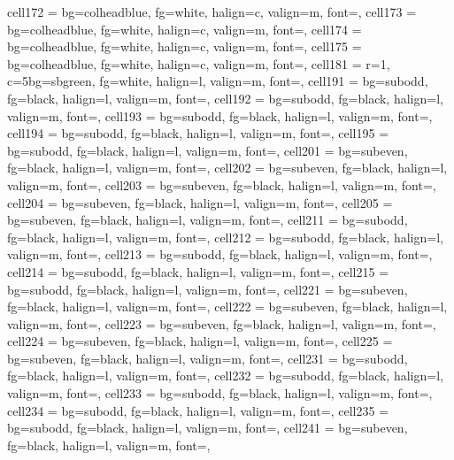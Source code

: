 \documentclass[a4paper,12pt]{article}
\begin{document}
\begin{longtblr}
{  cell{17}{2} = {bg=colheadblue, fg=white, halign=c, valign=m, font=\bfseries},
  cell{17}{3} = {bg=colheadblue, fg=white, halign=c, valign=m, font=\bfseries},
  cell{17}{4} = {bg=colheadblue, fg=white, halign=c, valign=m, font=\bfseries},
  cell{17}{5} = {bg=colheadblue, fg=white, halign=c, valign=m, font=\bfseries},
  cell{18}{1} = {r=1, c=5}{bg=sbgreen, fg=white, halign=l, valign=m, font=\small\bfseries},
  cell{19}{1} = {bg=subodd,  fg=black, halign=l, valign=m, font=\footnotesize},
  cell{19}{2} = {bg=subodd,  fg=black, halign=l, valign=m, font=\footnotesize},
  cell{19}{3} = {bg=subodd,  fg=black, halign=l, valign=m, font=\footnotesize},
  cell{19}{4} = {bg=subodd,  fg=black, halign=l, valign=m, font=\footnotesize},
  cell{19}{5} = {bg=subodd,  fg=black, halign=l, valign=m, font=\footnotesize},
  cell{20}{1} = {bg=subeven, fg=black, halign=l, valign=m, font=\footnotesize},
  cell{20}{2} = {bg=subeven, fg=black, halign=l, valign=m, font=\footnotesize},
  cell{20}{3} = {bg=subeven, fg=black, halign=l, valign=m, font=\footnotesize},
  cell{20}{4} = {bg=subeven, fg=black, halign=l, valign=m, font=\footnotesize},
  cell{20}{5} = {bg=subeven, fg=black, halign=l, valign=m, font=\footnotesize},
  cell{21}{1} = {bg=subodd,  fg=black, halign=l, valign=m, font=\footnotesize},
  cell{21}{2} = {bg=subodd,  fg=black, halign=l, valign=m, font=\footnotesize},
  cell{21}{3} = {bg=subodd,  fg=black, halign=l, valign=m, font=\footnotesize},
  cell{21}{4} = {bg=subodd,  fg=black, halign=l, valign=m, font=\footnotesize},
  cell{21}{5} = {bg=subodd,  fg=black, halign=l, valign=m, font=\footnotesize},
  cell{22}{1} = {bg=subeven, fg=black, halign=l, valign=m, font=\footnotesize},
  cell{22}{2} = {bg=subeven, fg=black, halign=l, valign=m, font=\footnotesize},
  cell{22}{3} = {bg=subeven, fg=black, halign=l, valign=m, font=\footnotesize},
  cell{22}{4} = {bg=subeven, fg=black, halign=l, valign=m, font=\footnotesize},
  cell{22}{5} = {bg=subeven, fg=black, halign=l, valign=m, font=\footnotesize},
  cell{23}{1} = {bg=subodd,  fg=black, halign=l, valign=m, font=\footnotesize},
  cell{23}{2} = {bg=subodd,  fg=black, halign=l, valign=m, font=\footnotesize},
  cell{23}{3} = {bg=subodd,  fg=black, halign=l, valign=m, font=\footnotesize},
  cell{23}{4} = {bg=subodd,  fg=black, halign=l, valign=m, font=\footnotesize},
  cell{23}{5} = {bg=subodd,  fg=black, halign=l, valign=m, font=\footnotesize},
  cell{24}{1} = {bg=subeven, fg=black, halign=l, valign=m, font=\footnotesize},
}
\end{longtblr}
\end{document}
